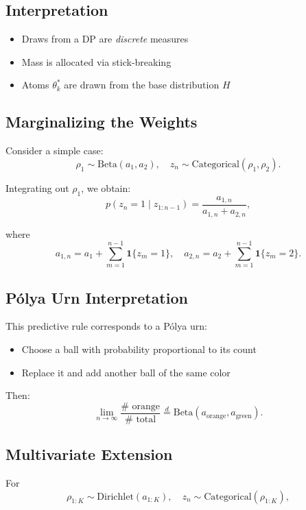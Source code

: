 \documentclass[12pt,oneside]{book}
\numberwithin{equation}{section}
\theoremstyle{definition}
\theoremstyle{plain}
\theoremstyle{remark}
\begin{document}
\subsection*{Interpretation}

\begin{itemize}
\item Draws from a DP are \emph{discrete} measures
\item Mass is allocated via stick-breaking
\item Atoms $\theta_k^*$ are drawn from the base distribution $H$
\end{itemize}

\subsection*{Marginalizing the Weights}

Consider a simple case:
\[
\rho_1 \sim \mathrm{Beta}(a_1,a_2), \quad z_n \sim \mathrm{Categorical}(\rho_1,\rho_2).
\]

Integrating out $\rho_1$, we obtain:
\[
p(z_n = 1 \mid z_{1:n-1})
=
\frac{a_{1,n}}{a_{1,n} + a_{2,n}},
\]

where
\[
a_{1,n} = a_1 + \sum_{m=1}^{n-1} \mathbf{1}\{z_m = 1\},
\quad
a_{2,n} = a_2 + \sum_{m=1}^{n-1} \mathbf{1}\{z_m = 2\}.
\]

\subsection{Pólya Urn Interpretation}

This predictive rule corresponds to a Pólya urn:

\begin{itemize}
\item Choose a ball with probability proportional to its count
\item Replace it and add another ball of the same color
\end{itemize}

Then:
\[
\lim_{n \to \infty}
\frac{\# \text{ orange}}{\# \text{ total}}
\stackrel{d}{=} \mathrm{Beta}(a_{\text{orange}}, a_{\text{green}}).
\]

\subsection*{Multivariate Extension}

For
\[
\rho_{1:K} \sim \mathrm{Dirichlet}(a_{1:K}), \quad z_n \sim \mathrm{Categorical}(\rho_{1:K}),
\]
\end{document}
